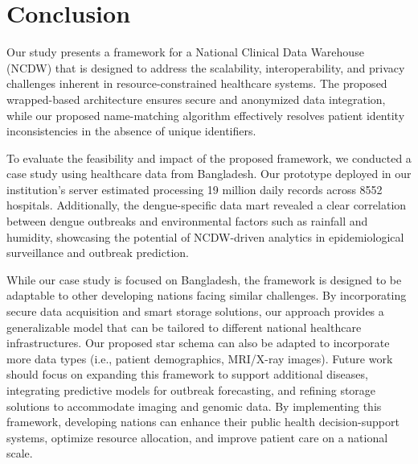 \section{Conclusion}
Our study presents a framework for a National Clinical Data Warehouse (NCDW) that is designed to address the scalability, interoperability, and privacy challenges inherent in resource-constrained healthcare systems. The proposed wrapped-based architecture ensures secure and anonymized data integration, while our proposed name-matching algorithm effectively resolves patient identity inconsistencies in the absence of unique identifiers.

To evaluate the feasibility and impact of the proposed framework, we conducted a case study using healthcare data from Bangladesh. Our prototype deployed in our institution's server estimated processing 19 million daily records across 8552 hospitals. Additionally, the dengue-specific data mart revealed a clear correlation between dengue outbreaks and environmental factors such as rainfall and humidity, showcasing the potential of NCDW-driven analytics in epidemiological surveillance and outbreak prediction. 

While our case study is focused on Bangladesh, the framework is designed to be adaptable to other developing nations facing similar challenges. By incorporating secure data acquisition and smart storage solutions, our approach provides a generalizable model that can be tailored to different national healthcare infrastructures. Our proposed star schema can also be adapted to incorporate more data types (i.e., patient demographics,
MRI/X-ray images). Future work should focus on expanding this framework to support additional diseases, integrating predictive models for outbreak forecasting, and refining storage solutions to accommodate imaging and genomic data. By implementing this framework, developing nations can enhance their public health decision-support systems, optimize resource allocation, and improve patient care on a national scale.



